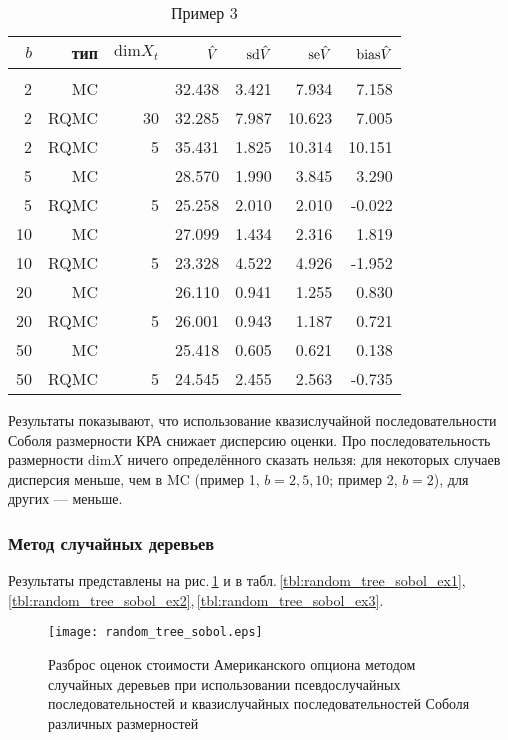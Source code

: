 \begin{table}
    \caption{Пример 3}\label{tbl:lsm_sobol_ex3}
    \begin{tabular}{rrrrrrr}
        $b$&тип&$\mathrm{dim} X_t$&$\hat{V}$&$\mathrm{sd}\hat{V}$&$\mathrm{se}\hat{V}$&$\mathrm{bias}\hat{V}$\\[3pt]\hline\\[-8pt]
        2&MC&&32.438&3.421&7.934&7.158\\
        2&RQMC&30&32.285&7.987&10.623&7.005\\
        2&RQMC&5&35.431&1.825&10.314&10.151\\[3pt]
        5&MC&&28.570&1.990&3.845&3.290\\
        5&RQMC&5&25.258&2.010&2.010&-0.022\\[3pt]
        10&MC&&27.099&1.434&2.316&1.819\\
        10&RQMC&5&23.328&4.522&4.926&-1.952\\[3pt]
        20&MC&&26.110&0.941&1.255&0.830\\
        20&RQMC&5&26.001&0.943&1.187&0.721\\[3pt]
        50&MC&&25.418&0.605&0.621&0.138\\
        50&RQMC&5&24.545&2.455&2.563&-0.735\\[3pt]
    \end{tabular}
\end{table}

Результаты показывают, что использование квазислучайной последовательности Соболя размерности КРА снижает дисперсию оценки. Про последовательность размерности $\mathrm{dim} X$ ничего определённого сказать нельзя: для некоторых случаев дисперсия меньше, чем в MC (пример 1, $b=2,5,10$; пример 2, $b=2$), для других --- меньше.


\subsubsection{Метод случайных деревьев} %
\label{ssub:results:qmc_to_classical:sobol:random_tree}

Результаты представлены на рис.\,\ref{fig:random_tree_sobol} и в табл.\,\ref{tbl:random_tree_sobol_ex1},\,\ref{tbl:random_tree_sobol_ex2},\,\ref{tbl:random_tree_sobol_ex3}.

\begin{figure}[p]
    \centering
    \texttt{[image: random\_tree\_sobol.eps]}
    \caption{Разброс оценок стоимости Американского опциона методом случайных деревьев при использовании псевдослучайных последовательностей и квазислучайных последовательностей Соболя различных размерностей}
    \label{fig:random_tree_sobol}
\end{figure}

